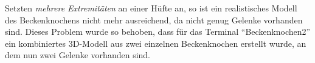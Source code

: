 \newpage
Setzten \emph{mehrere Extremitäten} an einer Hüfte an, so ist ein realistisches Modell des Beckenknochens nicht mehr ausreichend, da nicht genug Gelenke vorhanden sind. Dieses Problem wurde so behoben, dass für das Terminal "`Beckenknochen2"' ein kombiniertes 3D-Modell aus zwei einzelnen Beckenknochen erstellt wurde, an dem nun zwei Gelenke vorhanden sind.




